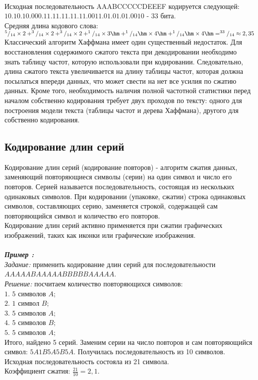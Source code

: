 \\Исходная последовательность AAABCCCCCDEEEF кодируется следующей: $10.10.10.000.11.11.11.11.11.0011.01.01.01.0010$ - 33 бита.
\\Средняя длина кодового слова: $^5/_{14}\times 2 + ^3/_{14}\times 2 + ^3/_{14}\times 2 + ^1/_{14}\times 3\hm + ^1/_{14}\hm\times 4\hm + ^1/_{14}\hm\times 4\hm = ^{33}/_{14} \approx 2,35$
Классический алгоритм Хаффмана имеет один существенный недостаток. Для восстановления содержимого сжатого текста при декодировании необходимо знать таблицу частот, которую использовали при кодировании. Следовательно, длина сжатого текста увеличивается на длину таблицы частот, которая должна посылаться впереди данных, что может свести на нет все усилия по сжатию данных. Кроме того, необходимость наличия полной частотной статистики перед началом собственно кодирования требует двух проходов по тексту: одного для построения модели текста (таблицы частот и дерева Хаффмана), другого для собственно кодирования.\\

\subsection{Кодирование длин серий}
Кодирование длин серий (кодирование повторов) - алгоритм сжатия данных, заменяющий повторяющиеся символы (серии) на один символ и число его повторов. Серией называется последовательность, состоящая из нескольких одинаковых символов. При кодировании (упаковке, сжатии) строка одинаковых символов, составляющих серию, заменяется строкой, содержащей сам повторяющийся символ и количество его повторов.
\\Кодирование длин серий активно применяется при сжатии графических изображений, таких как иконки или графические изображения.
\\
\\\emph{\textbf{Пример :}}
\\\emph{Задание:} применить кодирование длин серий для последовательности \\$AAAAABAAAAABBBBBAAAAA$.
\\\emph{Решение:} посчитаем количество повторяющихся символов:
\\$1.$ $5$ символов $A$;
\\$2.$ $1$ символ $B$;
\\$3.$ $5$ символов $A$;
\\$4.$ $5$ символов $B$;
\\$5.$ $5$ символов $A$;
\\Итого, найдено 5 серий. Заменим серии на число повторов и сам повторяющийся символ: $5A1B5A5B5A$. Получилась последовательность из 10 символов. Исходная последовательность состояла из 21 символа.
\\Коэффициент сжатия: $\frac{21}{10} = 2,1$.

